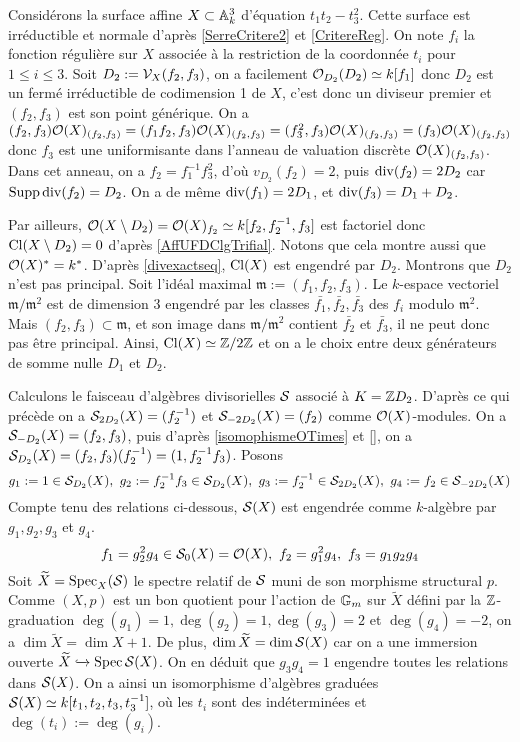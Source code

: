 \begin{ex}
Considérons la surface affine $X\subset \mathbb{A}_k^3$ d'équation $t_1t_2-t_3^2$. Cette surface est irréductible et normale d'après \ref{SerreCritere2} et \ref{CritereReg}. On note $f_i$ la fonction régulière sur $X$ associée à la restriction de la coordonnée $t_i$ pour $1\leq i\leq 3$. Soit $D_2:=\mathcal{V}_X(f_2,f_3)$, on a facilement $\mathcal{O}_{D_2}(D_2)\simeq k[f_1]$ donc $D_2$ est un fermé irréductible de codimension 1 de $X$, c'est donc un diviseur premier et $(f_2,f_3)$ est son point générique. On a $(f_2,f_3)\mathcal{O}(X)_{(f_2,f_3)}=(f_1f_2,f_3)\mathcal{O}(X)_{(f_2,f_3)}=(f_3^2,f_3)\mathcal{O}(X)_{(f_2,f_3)}=(f_3)\mathcal{O}(X)_{(f_2,f_3)}$ donc $f_3$ est une uniformisante dans l'anneau de valuation discrète $\mathcal{O}(X)_{(f_2,f_3)}$. Dans cet anneau, on a $f_2=f_1^{-1}f_3^2$, d'où $v_{D_2}(f_2)=2$, puis $\operatorname{div}(f_2)=2D_2$ car $\operatorname{Supp} \operatorname{div}(f_2)=D_2$. On a de même $\operatorname{div}(f_1)=2D_1$, et $\operatorname{div}(f_3)=D_1+D_2$.

Par ailleurs, $\mathcal{O}(X\setminus D_2)=\mathcal{O}(X)_{f_2}\simeq k[f_2,f_2^{-1},f_3]$ est factoriel donc $\operatorname{Cl}(X\setminus D_2)=0$ d'après \ref{AffUFDClgTrifial}. Notons que cela montre aussi que $\mathcal{O}(X)^*=k^*$. D'après \ref{divexactseq}, $\operatorname{Cl}(X)$ est engendré par $D_2$. Montrons que $D_2$ n'est pas principal. Soit l'idéal maximal $\mathfrak{m}:=(f_1,f_2,f_3)$. Le $k$-espace vectoriel $\mathfrak{m}/\mathfrak{m}^2$ est de dimension $3$ engendré par les classes $\bar{f_1},\bar{f_2},\bar{f_3}$ des $f_i$ modulo $\mathfrak{m}^2$. Mais $(f_2,f_3)\subset \mathfrak{m}$, et son image dans $\mathfrak{m}/\mathfrak{m}^2$ contient $\bar{f_2}$ et $\bar{f_3}$, il ne peut donc pas être principal. Ainsi, $\operatorname{Cl}(X)\simeq \mathbb{Z}/2\mathbb{Z}$ et on a le choix entre deux générateurs de somme nulle $D_1$ et $D_2$.

Calculons le faisceau d'algèbres divisorielles $\mathcal{S}$ associé à $K=\mathbb{Z} D_2$. D'après ce qui précède on a $\mathcal{S}_{2D_2}(X)=(f_2^{-1})$ et $\mathcal{S}_{-2D_2}(X)=(f_2)$ comme $\mathcal{O}(X)$-modules. On a $\mathcal{S}_{-D_2}(X)=(f_2,f_3)$, puis d'après \ref{isomophismeOTimes} et \ref{}, on a $\mathcal{S}_{D_2}(X)=(f_2,f_3)(f_2^{-1})=(1,f_2^{-1}f_3)$. Posons 
$$g_1:=1\in\mathcal{S}_{D_2}(X), \,\,g_2:=f_2^{-1}f_3\in\mathcal{S}_{D_2}(X),\,\,g_3:=f_2^{-1}\in \mathcal{S}_{2D_2}(X), \,\,g_4:=f_2\in\mathcal{S}_{-2D_2}(X)$$
Compte tenu des relations ci-dessous, $\mathcal{S}(X)$ est engendrée comme $k$-algèbre par $g_1,g_2,g_3$ et $g_4$.
$$f_1=g_2^2g_4\in\mathcal{S}_0(X)=\mathcal{O}(X),\,\,f_2=g_1^2g_4,\,\,f_3=g_1g_2g_4$$
Soit $\widetilde{X}=\operatorname{Spec}_X(\mathcal{S})$ le spectre relatif de $\mathcal{S}$ muni de son morphisme structural $p$. Comme $(X,p)$ est un bon quotient pour l'action de $\mathbb{G}_m$ sur $\widetilde{X}$ défini par la $\mathbb{Z}$-graduation $\deg(g_1)=1,\deg(g_2)=1,\deg(g_3)=2$ et $\deg(g_4)=-2$, on a $\dim \widetilde{X}=\dim X+ 1$. De plus, $\dim \widetilde{X}=\dim \mathcal{S}(X)$ car on a une immersion ouverte $\widetilde{X}\xhookrightarrow{} \operatorname{Spec} \mathcal{S}(X)$. On en déduit que $g_3g_4=1$ engendre toutes les relations dans $\mathcal{S}(X)$. On a ainsi un isomorphisme d'algèbres graduées $\mathcal{S}(X)\simeq k[t_1,t_2,t_3, t_3^{-1}]$, où les $t_i$ sont des indéterminées et $\deg(t_i):=\deg(g_i)$.


\end{ex}
